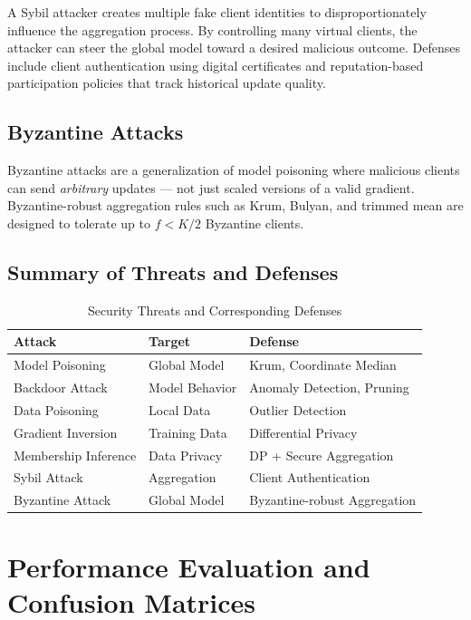 \documentclass[conference]{IEEEtran}
\begin{document}
A Sybil attacker creates multiple fake client identities to disproportionately influence the aggregation process. By controlling many virtual clients, the attacker can steer the global model toward a desired malicious outcome. Defenses include client authentication using digital certificates and reputation-based participation policies that track historical update quality.

\subsection{Byzantine Attacks}

Byzantine attacks are a generalization of model poisoning where malicious clients can send \emph{arbitrary} updates — not just scaled versions of a valid gradient. Byzantine-robust aggregation rules such as Krum, Bulyan, and trimmed mean are designed to tolerate up to $f < K/2$ Byzantine clients.

\subsection{Summary of Threats and Defenses}

\begin{table}[H]
\centering
\caption{Security Threats and Corresponding Defenses}
\label{tab:threats}
\renewcommand{\arraystretch}{1.3}
\begin{tabular}{|l|l|l|}
\hline
\textbf{Attack} & \textbf{Target} & \textbf{Defense} \\
\hline
Model Poisoning      & Global Model    & Krum, Coordinate Median \\
Backdoor Attack      & Model Behavior  & Anomaly Detection, Pruning \\
Data Poisoning       & Local Data      & Outlier Detection \\
Gradient Inversion   & Training Data   & Differential Privacy \\
Membership Inference & Data Privacy    & DP + Secure Aggregation \\
Sybil Attack         & Aggregation     & Client Authentication \\
Byzantine Attack     & Global Model    & Byzantine-robust Aggregation \\
\hline
\end{tabular}
\end{table}

\section{Performance Evaluation and Confusion Matrices}
\end{document}

